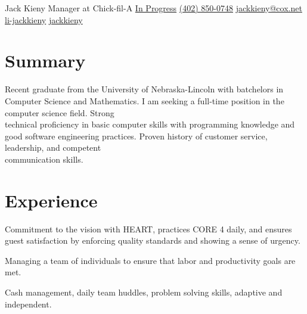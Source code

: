 \documentclass[]{latex/resume}
\begin{document}
%
%

\namesection
    {Jack}
    {Kieny}
    {Manager at Chick-fil-A}
    {\contactline
        {\href{}{In Progress}}
        {\href{tel:+1402850047}{(402) 850-0748}}
        {\href{mailto:jackkieny@cox.net}{jackkieny@cox.net}}
        {\href{https://www.linkedin.com/in/jackkieny}{li-jackkieny}}
        {\href{https://www.github.com/jackkieny}{jackkieny}}
    }       
        

%
%

\begin{minipage}[t]{0.75\textwidth} 

\section{Summary}
Recent graduate from the University of Nebraska-Lincoln with batchelors in Computer Science and Mathematics.
I am seeking a full-time position in the computer science field.
Strong\\technical proficiency in basic computer skills with programming knowledge and good software engineering practices.
Proven history of customer service, leadership, and competent\\communication skills.


\sectionsep


\section{Experience}
     
    \vspace{\topsep} %
    \begin{tightemize}
        \sectionsep
            \item Commitment to the vision with HEART, practices CORE 4 daily, and ensures guest satisfaction by enforcing quality standards and showing a sense of urgency.
            \item Managing a team of individuals to ensure that labor and productivity goals are met.
            \item Cash management, daily team huddles, problem solving skills, adaptive and independent.
    \end{tightemize}
    

\end{minipage}
\end{document}

